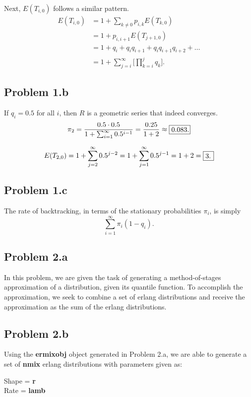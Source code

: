 \documentclass[letter]{article}
\begin{document}
Next, $E(T_{i,0})$ follows a similar pattern. 
\begin{equation*}
  \begin{aligned}
      E(T_{i,0}) &= 1 + \sum_{k \ne 0}{p_{i,k}E(T_{k,0})} \\ 
                 &= 1 + p_{i,i+1}E(T_{j+1,0}) \\
                 &= 1 + q_i + q_iq_{i+1} + q_iq_{i+1}q_{i+2} + \dots \\
                 &= 1 + \sum_{j=i}^\infty{\Big[ \prod_{k=i}^{j}{q_k} \Big]}.
  \end{aligned}
\end{equation*}


\subsection*{Problem 1.b}
If $q_i = 0.5$ for all $i$, then $R$ is a geometric series that indeed converges. 
$$ \pi_2 = \frac{0.5 \cdot 0.5}{1 + \sum_{i=1}^\infty{0.5^{i-1}}} = 
           \frac{0.25}{1+2} \approx \fbox {\parbox{0.33in}{0.083.}}$$

$$ E(T_{2,0}) = 1 + \sum_{j=2}^\infty{0.5^{j-2}} 
              = 1 + \sum_{j=1}^\infty{0.5^{j-1}} = 1 + 2 = \fbox{\parbox{0.12in}{3.}} $$

\subsection*{Problem 1.c}
The rate of backtracking, in terms of the stationary probabilities $\pi_i$, is simply
$$ \sum_{i=1}^\infty{\pi_i(1 - q_i)}. $$


\subsection*{Problem 2.a}
    In this problem, we are given the task of generating a method-of-stages approximation of a distribution, given its quantile function.  To accomplish the approximation, we seek to combine a set of erlang distributions and receive the approximation as the sum of the erlang distributions.

\subsection*{Problem 2.b}

    Using the \textbf{ermixobj} object generated in Problem 2.a, we are able to generate a set of \textbf{nmix} erlang distributions with
parameters given as:\\
\begin{center}
\large{
Shape = \textbf{r}\\
Rate = \textbf{lamb}\\
}
\end{center}
  
\end{document}
